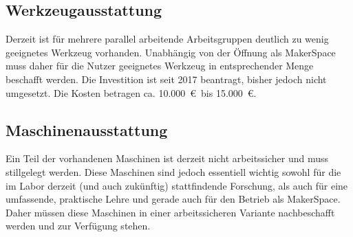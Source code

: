 \documentclass[parskip=half,headsepline,footsepline,titlepage]{scrartcl}
\begin{document}
\subsection{Werkzeugausstattung}
Derzeit ist für mehrere parallel arbeitende Arbeitsgruppen deutlich zu wenig geeignetes Werkzeug vorhanden. Unabhängig von der Öffnung als MakerSpace muss daher für die Nutzer geeignetes Werkzeug in entsprechender Menge beschafft werden. Die Investition ist seit 2017 beantragt, bisher jedoch nicht umgesetzt. Die Kosten betragen ca. 10.000~\euro\ bis 15.000~\euro.

\subsection{Maschinenausstattung}
Ein Teil der vorhandenen Maschinen ist derzeit nicht arbeitssicher und muss stillgelegt werden. Diese Maschinen sind jedoch essentiell wichtig sowohl für die im Labor derzeit (und auch zukünftig) stattfindende Forschung, als auch für eine umfassende, praktische Lehre und gerade auch für den Betrieb als MakerSpace. Daher müssen diese Maschinen in einer arbeitssicheren Variante nachbeschafft werden und zur Verfügung stehen.
\end{document}
